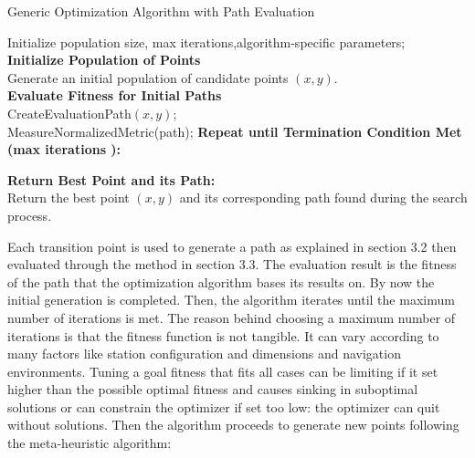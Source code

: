 \begin{algorithm}[H]
    \caption{Generic Optimization Algorithm with Path Evaluation}\label{optimization}
    
    
    Initialize  
    population size, max iterations,algorithm-specific parameters;\\
    \textbf{Initialize Population of Points}\\
    Generate an initial population of candidate points $(x, y)$.\\

    \textbf{Evaluate Fitness for Initial Paths}\\
    CreateEvaluationPath$(x, y)$;\\
    MeasureNormalizedMetric(path);    
    \textbf{Repeat until Termination Condition Met (max iterations ):}\\
    
    \textbf{Return Best Point and its Path:}\\
    Return the best point $(x, y)$ and its corresponding path found during the search process.
    \end{algorithm}



Each transition point is used to generate a path as explained
in section 3.2 then evaluated through the method in section 3.3. The evaluation result is the fitness of the path that the 
optimization algorithm bases its results on. By now the initial generation is completed. Then, the algorithm iterates until 
the maximum number of iterations is met. The reason behind choosing a maximum number of iterations is that the fitness function 
is not tangible. It can vary according to many factors like station configuration and dimensions and navigation environments.
Tuning a goal fitness that fits all cases can be limiting if it set higher than the possible optimal fitness and causes sinking in 
suboptimal solutions or can constrain the optimizer if set too low: the optimizer can quit without solutions.
Then the algorithm proceeds to generate new points following the meta-heuristic algorithm:

